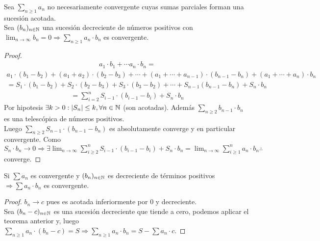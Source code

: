 \begin{theorem}
  Sea $\sum_{n \geq 1} a_n$ no necesariamente convergente cuyas sumas parciales forman una sucesión acotada. \\
  Sea $(b_n)_{n \in \mathbb{N}}$ una sucesión decreciente de números positivos con $\lim_{n \to \infty} b_n = 0 \Rightarrow \sum_{n \geq 1} a_n \cdot b_n$ es convergente.

  \begin{proof}
    \begin{align*}
      a_1 \cdot b_1 + \cdots a_n \cdot b_n =
    \end{align*}
    \begin{align*}
      a_1 \cdot (b_1 - b_2) + (a_1 + a_2) \cdot (b_2 - b_3) + \cdots + (a_1 + \cdots + a_{n-1}) \cdot (b_{n-1} - b_n) + (a_1 + \cdots + a_n) \cdot b_n
    \end{align*}
    \begin{align*}
      = S_1 \cdot (b_1 - b_2) + S_2 \cdot (b_2 - b_3) + S_3 \cdot (b_3 - b_2) + \cdots + S_{n-1} (b_{n-1} - b_n) + S_n \cdot b_n
    \end{align*}
    \begin{align*}
      = \sum_{i = 2}^n S_{i-1} \cdot (b_{i-1} - b_i) + S_n \cdot b_n
    \end{align*}
    Por hipotesis $\exists k > 0 : |S_n| \leq k, \forall n \in \mathbb{N}$ (son acotadas). Además $\sum_{n \geq 2} b_{n-1} \cdot b_n$ es una telescópica de números positivos. \\
    Luego $\sum_{n \geq 2} S_{n-1} \cdot (b_{n-1} - b_n)$ es absolutamente converge y en particular convergente.
    Como $S_n \cdot b_n \to 0 \Rightarrow \exists \lim_{n \to \infty} \sum_{i \geq 2}^n S_{i-1} \cdot (b_{i-1} - b_i) + S_n \cdot b_n = \lim_{n \to \infty} \sum_{i \geq 1}^n a_n \cdot b_n \therefore$ converge.
  \end{proof}
\end{theorem}

\clearpage

\begin{corollary}[Abel]
  Si $\sum a_n$ es convergente y $(b_n)_{n \in \mathbb{N}}$ es decreciente de términos positivos $\Rightarrow \sum a_n \cdot b_n$ es convergente.
  \begin{proof}
    $b_n \to c$ pues es acotada inferiormente por $0$ y decreciente. \\
    Sea $(b_n - c)_{n \in \mathbb{N}}$ es una sucesión decreciente que tiende a cero, podemos aplicar el teorema anterior y, luego $\sum_{n \geq 1} a_n \cdot (b_n - c) = S \Rightarrow \sum_{n \geq 1} a_n \cdot b_n = S - \sum a_n \cdot c$.
  \end{proof}
\end{corollary}

